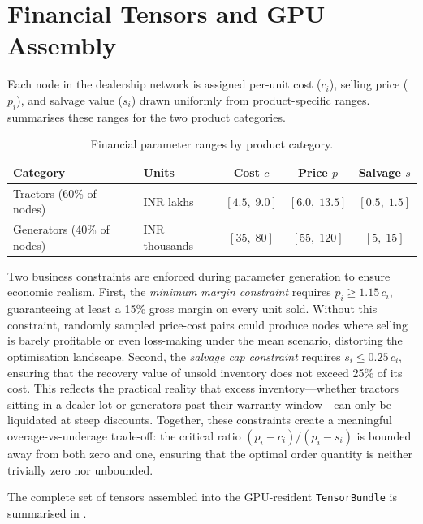 \section{Financial Tensors and GPU Assembly}\label{sec:finance}

Each node in the dealership network is assigned per-unit cost ($c_i$), selling price ($p_i$), and salvage value ($s_i$) drawn uniformly from product-specific ranges.  summarises these ranges for the two product categories.

\begin{table}[H]
\centering
\caption{Financial parameter ranges by product category.}
\label{tab:financial-ranges}
\begin{tabular}{llccc}
\toprule
\textbf{Category} & \textbf{Units} & \textbf{Cost $c$} & \textbf{Price $p$} & \textbf{Salvage $s$} \\
\midrule
Tractors (60\% of nodes) & INR lakhs & $[4.5,\; 9.0]$ & $[6.0,\; 13.5]$ & $[0.5,\; 1.5]$ \\
Generators (40\% of nodes) & INR thousands & $[35,\; 80]$ & $[55,\; 120]$ & $[5,\; 15]$ \\
\bottomrule
\end{tabular}
\end{table}

Two business constraints are enforced during parameter generation to ensure economic realism. First, the \emph{minimum margin constraint} requires $p_i \geq 1.15\, c_i$, guaranteeing at least a 15\% gross margin on every unit sold. Without this constraint, randomly sampled price-cost pairs could produce nodes where selling is barely profitable or even loss-making under the mean scenario, distorting the optimisation landscape. Second, the \emph{salvage cap constraint} requires $s_i \leq 0.25\, c_i$, ensuring that the recovery value of unsold inventory does not exceed 25\% of its cost. This reflects the practical reality that excess inventory---whether tractors sitting in a dealer lot or generators past their warranty window---can only be liquidated at steep discounts. Together, these constraints create a meaningful overage-vs-underage trade-off: the critical ratio $(p_i - c_i)/(p_i - s_i)$ is bounded away from both zero and one, ensuring that the optimal order quantity is neither trivially zero nor unbounded.

The complete set of tensors assembled into the GPU-resident \texttt{TensorBundle} is summarised in .

